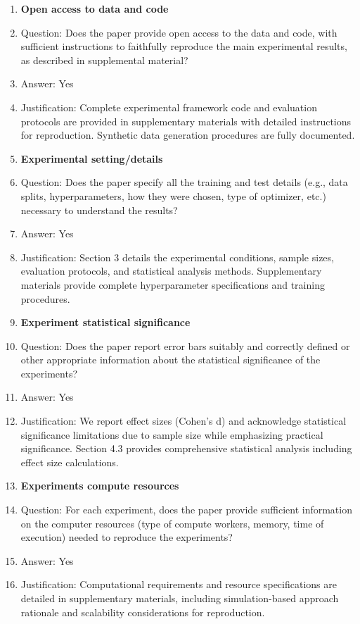 \documentclass{article}
\begin{document}
\begin{enumerate}
\item {\bf Open access to data and code}
    \item[] Question: Does the paper provide open access to the data and code, with sufficient instructions to faithfully reproduce the main experimental results, as described in supplemental material?
    \item[] Answer: Yes
    \item[] Justification: Complete experimental framework code and evaluation protocols are provided in supplementary materials with detailed instructions for reproduction. Synthetic data generation procedures are fully documented.

\item {\bf Experimental setting/details}
    \item[] Question: Does the paper specify all the training and test details (e.g., data splits, hyperparameters, how they were chosen, type of optimizer, etc.) necessary to understand the results?
    \item[] Answer: Yes
    \item[] Justification: Section 3 details the experimental conditions, sample sizes, evaluation protocols, and statistical analysis methods. Supplementary materials provide complete hyperparameter specifications and training procedures.

\item {\bf Experiment statistical significance}
    \item[] Question: Does the paper report error bars suitably and correctly defined or other appropriate information about the statistical significance of the experiments?
    \item[] Answer: Yes
    \item[] Justification: We report effect sizes (Cohen's d) and acknowledge statistical significance limitations due to sample size while emphasizing practical significance. Section 4.3 provides comprehensive statistical analysis including effect size calculations.

\item {\bf Experiments compute resources}
    \item[] Question: For each experiment, does the paper provide sufficient information on the computer resources (type of compute workers, memory, time of execution) needed to reproduce the experiments?
    \item[] Answer: Yes
    \item[] Justification: Computational requirements and resource specifications are detailed in supplementary materials, including simulation-based approach rationale and scalability considerations for reproduction.


\end{enumerate}
\end{document}
